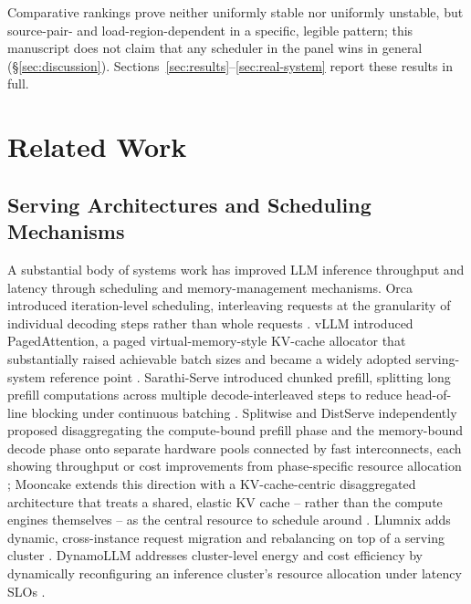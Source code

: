 \documentclass[sn-basic,Numbered,pdflatex]{sn-jnl}
\begin{document}
Comparative rankings prove neither uniformly stable nor uniformly
unstable, but source-pair- and load-region-dependent in a specific,
legible pattern; this manuscript does not claim that any scheduler in the
panel wins in general (\S\ref{sec:discussion}). Sections~\ref{sec:results}--\ref{sec:real-system}
report these results in full.

\section{Related Work}
\label{sec:related-work}

\subsection{Serving Architectures and Scheduling Mechanisms}
\label{sec:related-serving}

A substantial body of systems work has improved LLM inference throughput and
latency through scheduling and memory-management mechanisms. Orca introduced
iteration-level scheduling, interleaving requests at the granularity of
individual decoding steps rather than whole requests
\citep{yu2022orca}. vLLM introduced PagedAttention, a paged
virtual-memory-style KV-cache allocator that substantially raised achievable
batch sizes and became a widely adopted serving-system reference point
\citep{kwon2023vllm}. Sarathi-Serve introduced chunked prefill, splitting
long prefill computations across multiple decode-interleaved steps to reduce
head-of-line blocking under continuous batching \citep{agrawal2024sarathi}.
Splitwise and DistServe independently proposed disaggregating the
compute-bound prefill phase and the memory-bound decode phase onto separate
hardware pools connected by fast interconnects, each showing throughput or
cost improvements from phase-specific resource allocation
\citep{patel2024splitwise,zhong2024distserve}; Mooncake extends this
direction with a KV-cache-centric disaggregated architecture that treats a
shared, elastic KV cache -- rather than the compute engines themselves -- as
the central resource to schedule around \citep{qin2025mooncake}. Llumnix
adds dynamic, cross-instance request migration and rebalancing on top of a
serving cluster \citep{sun2024llumnix}. DynamoLLM addresses cluster-level
energy and cost efficiency by dynamically reconfiguring an inference
cluster's resource allocation under latency SLOs \citep{stojkovic2025dynamollm}.
\end{document}

